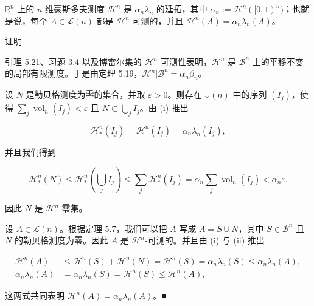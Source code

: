 \begin{corollary}

$ \mathbb{R}^n $ 上的 $ n $ 维豪斯多夫测度 $ \mathcal{H}^n $ 是 $ \alpha_n \lambda_n $ 的延拓，其中 $ \alpha_n := \mathcal{H}^n([0, 1)^n) $；也就是说，每个 $ A \in \mathcal{L}(n) $ 都是 $ \mathcal{H}^n $-可测的，并且 $ \mathcal{H}^n(A) = \alpha_n \lambda_n(A) $。

证明

\begin{subitems}
\item

引理 5.21、习题 3.4 以及博雷尔集的 $ \mathcal{H}^n $-可测性表明，$ \mathcal{H}^n $ 是 $ \mathcal{B}^n $ 上的平移不变的局部有限测度。于是由定理 5.19，$ \mathcal{H}^n|\mathcal{B}^n = \alpha_n \beta_n $。

\item

设 $ N $ 是勒贝格测度为零的集合，并取 $ \varepsilon > 0 $。则存在 $ \mathbb{J}(n) $ 中的序列 $ (I_j) $，使得 $ \sum_j \operatorname{vol}_n(I_j) < \varepsilon $ 且 $ N \subset \bigcup_j I_j $。由 (i) 推出

\[
\mathcal{H}^n_*(I_j) = \mathcal{H}^n(I_j) = \alpha_n \lambda_n(I_j) ,
\]

并且我们得到

\[
\mathcal{H}^n_*(N) \le \mathcal{H}^n_* \left( \bigcup_j I_j \right) \le \sum_j \mathcal{H}^n_*(I_j) = \alpha_n \sum_j \operatorname{vol}_n(I_j) < \alpha_n \varepsilon .
\]

因此 $ N $ 是 $ \mathcal{H}^n $-零集。

\item

设 $ A \in \mathcal{L}(n) $。根据定理 5.7，我们可以把 $ A $ 写成 $ A = S \cup N $，其中 $ S \in \mathcal{B}^n $ 且 $ N $ 的勒贝格测度为零。因此 $ A $ 是 $ \mathcal{H}^n $-可测的。并且由 (i) 与 (ii) 推出

\begin{equation*}
\begin{aligned}
\mathcal{H}^n(A) &\le \mathcal{H}^n(S) + \mathcal{H}^n(N) = \mathcal{H}^n(S) = \alpha_n \lambda_n(S) \le \alpha_n \lambda_n(A) , \\ \alpha_n \lambda_n(A) &= \alpha_n \lambda_n(S) = \mathcal{H}^n(S) \le \mathcal{H}^n(A) ,
\end{aligned}
\end{equation*}

这两式共同表明 $ \mathcal{H}^n(A) = \alpha_n \lambda_n(A) $。\nobreak\hspace{0.35em}■

\end{subitems}

\end{corollary}

